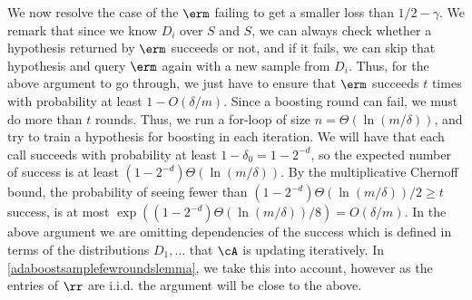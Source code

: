 We now resolve the case of the $ \erm $ failing to get a smaller loss than $ 1/2-\gamma $. We remark that since we know $ D_{i} $ over $ S $ and $ S $, we can always check whether a hypothesis returned by $ \erm $ succeeds or not, and if it fails, we can skip that hypothesis and query $ \erm $ again with a new sample from $ D_{i}$. Thus, for the above argument to go through, we just have to ensure that $ \erm $ succeeds $ t $  times with probability at least $ 1-O(\delta/m) $. Since a boosting round can fail, we must do more than $ t $ rounds. Thus, we 
run a for-loop of size $n= \Theta(\ln{\left(m/\delta\right)} )$, and try to train a hypothesis for boosting in each iteration.  We will have that each call succeeds with probability at least $1-\delta_{0}=1-2^{-d}$, so the expected number of success is at least $(1-2^{-d})\Theta(\ln{\left(m/\delta \right)} )$. By the multiplicative Chernoff bound, the probability of seeing fewer than $(1-2^{-d})\Theta(\ln{\left(m/\delta\right)} )/2 \geq t$ success, is at most $ \exp((1-2^{-d})\Theta(\ln{\left(m/\delta \right)} )/8)=O(\delta/m)$. In the above argument we are omitting dependencies of the success which is defined in terms of the distributions $ D_1,\ldots $  that $ \cA $  is updating iteratively. In \cref{adaboostsamplefewroundslemma}, we take this into account, however as the entries of $ \rr $ are i.i.d. the argument will be close to the above. 

